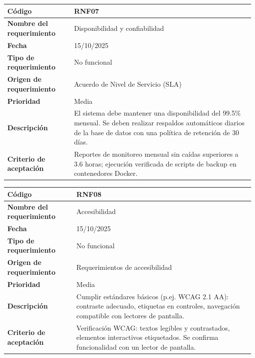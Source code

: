 \begin{table}[H]
	\begin{tabular}{|s{5cm}|m{11cm}|}
		\hline
		\textbf{Código} & RNF07 \\ \hline
		\textbf{Nombre del requerimiento} & Disponibilidad y confiabilidad \\ \hline
		\textbf{Fecha} & 15/10/2025 \\ \hline
		\textbf{Tipo de requerimiento} & No funcional \\ \hline
		\textbf{Origen de requerimiento} & Acuerdo de Nivel de Servicio (SLA) \\ \hline
		\textbf{Prioridad} & Media \\ \hline
		\textbf{Descripción} & El sistema debe mantener una disponibilidad del 99.5\% mensual. Se deben realizar respaldos automáticos diarios de la base de datos con una política de retención de 30 días. \\ \hline
		\textbf{Criterio de aceptación} & Reportes de monitoreo mensual sin caídas superiores a 3.6 horas; ejecución verificada de scripts de backup en contenedores Docker. \\ \hline
	\end{tabular}
\end{table}

\begin{table}[H]
	\begin{tabular}{|s{5cm}|m{11cm}|}
		\hline
		\textbf{Código} & RNF08 \\ \hline
		\textbf{Nombre del requerimiento} & Accesibilidad \\ \hline
		\textbf{Fecha} & 15/10/2025 \\ \hline
		\textbf{Tipo de requerimiento} & No funcional \\ \hline
		\textbf{Origen de requerimiento} & Requerimientos de accesibilidad \\ \hline
		\textbf{Prioridad} & Media \\ \hline
		\textbf{Descripción} & Cumplir estándares básicos (p.ej. WCAG 2.1 AA): contraste adecuado, etiquetas en controles, navegación compatible con lectores de pantalla. \\ \hline
		\textbf{Criterio de aceptación} & Verificación WCAG: textos legibles y contrastados, elementos interactivos etiquetados. Se confirma funcionalidad con un lector de pantalla. \\ \hline
	\end{tabular}
\end{table}

